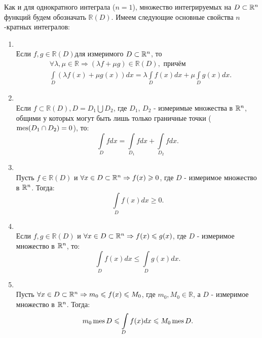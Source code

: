 Как и для однократного интеграла ($n = 1$), множество интегрируемых на $D \subset \mathbb{R}^n$ функций будем обозначать
$\mathbb{R}(D)$. Имеем следующие основные свойства $n$-кратных интегралов:
\begin{enumerate}
  \item {}\\
	Если $f, g \in \mathbb{R}(D)$для измеримого $D \subset \mathbb{R}^n$, то
	\begin{equation*}
		\begin{split}
			&\forall \lambda, \mu \in \mathbb{R} \Rightarrow (\lambda f + \mu g) \in \mathbb{R}(D),\text{ причём} \\
			&\int\limits_D (\lambda f(x) + \mu g(x))dx = \lambda \int\limits_D f(x)dx +
			\mu \int\limits_D g(x)dx.
		\end{split}
	\end{equation*}
  \item {}\\
	Если $f \subset \mathbb{R}(D), D = D_1 \bigcup D_2$, где $D_1$, $D_2$ - измеримые множества в $\mathbb{R}^n$,
	общими у которых могут быть лишь только граничные точки (${ \operatorname{mes}(D_1 \cap D_2) = 0 }$), то:
	\begin{equation*}
		\int\limits_{D}fdx = \int\limits_{D_1}fdx + \int\limits_{D_2}fdx.
	\end{equation*}
  \item {}\\
	Пусть $f \in \mathbb{R}(D)$ и
    $ \forall x \in D \subset \mathbb{R}^n \Rightarrow f(x) \geqslant 0 $, где
	$D$ - измеримое множество в $\mathbb{R}^n$. Тогда:
	\begin{equation*}
		\int\limits_Df(x)dx \geqslant 0.
	\end{equation*}
  \item {}\\
	Если $f, g \in \mathbb{R}(D)$ и $\forall x \in D \subset \mathbb{R}^n \Rightarrow f(x) \leqslant g(x)$,
	где $D$ - измеримое множество в $\mathbb{R}^n$, то:
	\begin{equation*}
		\int\limits_Df(x)dx \leqslant \int\limits_Dg(x)dx.
	\end{equation*}
  \item {}\\
	Пусть $\forall x \in D \subset \mathbb{R}^n \Rightarrow m_0 \leqslant f(x) \leqslant M_0$, где
	$m_0, M_0 \in \mathbb{R}$, а $D$ - измеримое множество в $\mathbb{R}^n$. Тогда:
	\begin{equation*}
		m_0 \operatorname{mes} D \leqslant \int\limits_D f(x) dx \leqslant M_0 \operatorname{mes} D.
	\end{equation*}
\end{enumerate}

